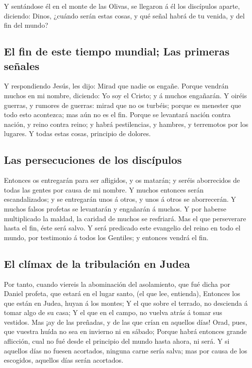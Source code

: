  Y sentándose él en el monte de las Olivas, se llegaron á él
los discípulos aparte, diciendo: Dinos, ¿cuándo serán estas cosas, y qué
señal habrá de tu venida, y del fin del mundo?

\hypertarget{el-fin-de-este-tiempo-mundial-las-primeras-seuxf1ales}{%
\subsection{El fin de este tiempo mundial; Las primeras
señales}\label{el-fin-de-este-tiempo-mundial-las-primeras-seuxf1ales}}

 Y respondiendo Jesús, les dijo: Mirad que nadie os engañe.
 Porque vendrán muchos en mi nombre, diciendo: Yo soy el
Cristo; y á muchos engañarán.  Y oiréis guerras, y rumores
de guerras: mirad que no os turbéis; porque es menester que todo esto
acontezca; mas aún no es el fin.  Porque se levantará nación
contra nación, y reino contra reino; y habrá pestilencias, y hambres, y
terremotos por los lugares.  Y todas estas cosas, principio
de dolores.

\hypertarget{las-persecuciones-de-los-discuxedpulos}{%
\subsection{Las persecuciones de los
discípulos}\label{las-persecuciones-de-los-discuxedpulos}}

 Entonces os entregarán para ser afligidos, y os matarán; y
seréis aborrecidos de todas las gentes por causa de mi nombre.
 Y muchos entonces serán escandalizados; y se entregarán
unos á otros, y unos á otros se aborrecerán.  Y muchos
falsos profetas se levantarán y engañarán á muchos.  Y por
haberse multiplicado la maldad, la caridad de muchos se resfriará.
 Mas el que perseverare hasta el fin, éste será salvo.
 Y será predicado este evangelio del reino en todo el
mundo, por testimonio á todos los Gentiles; y entonces vendrá el fin.

\hypertarget{el-cluxedmax-de-la-tribulaciuxf3n-en-judea}{%
\subsection{El clímax de la tribulación en
Judea}\label{el-cluxedmax-de-la-tribulaciuxf3n-en-judea}}

 Por tanto, cuando viereis la abominación del asolamiento,
que fué dicha por Daniel profeta, que estará en el lugar santo, (el que
lee, entienda),  Entonces los que están en Judea, huyan á
los montes;  Y el que sobre el terrado, no descienda á
tomar algo de su casa;  Y el que en el campo, no vuelva
atrás á tomar sus vestidos.  Mas ¡ay de las preñadas, y de
las que crían en aquellos días!  Orad, pues, que vuestra
huída no sea en invierno ni en sábado;  Porque habrá
entonces grande aflicción, cual no fué desde el principio del mundo
hasta ahora, ni será.  Y si aquellos días no fuesen
acortados, ninguna carne sería salva; mas por causa de los escogidos,
aquellos días serán acortados.

